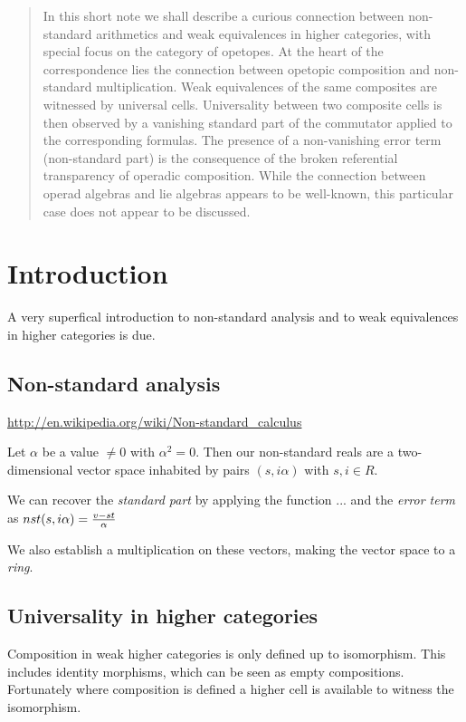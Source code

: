 \documentclass{article}
\begin{document}
\newcommand{\compose}[3]{$#1{;_#2}#3$}
\newcommand{\nsproduct}[3]{$(#1 + #2)(#3 + #2)$}
\newcommand{\lie}[4]{$#1{_{[#2,#3]}}#4$}

\begin{abstract}
In this short note we shall describe a curious connection
between non-standard arithmetics and weak equivalences
in higher categories, with special focus on the category of
opetopes. At the heart of the correspondence lies the
connection between opetopic composition and non-standard
multiplication. Weak equivalences of the same composites are
witnessed by universal cells. Universality between two
composite cells is then observed by a vanishing standard
part of the commutator applied to the corresponding formulas.
The presence of a non-vanishing error term (non-standard part)
is the consequence of the broken referential transparency of
operadic composition.
While the connection between operad algebras and
lie algebras appears to be well-known, this particular
case does not appear to be discussed.
\end{abstract}

\section{Introduction}
A very superfical introduction to non-standard analysis
and to weak equivalences in higher categories is due.

\subsection{Non-standard analysis}

\url{http://en.wikipedia.org/wiki/Non-standard_calculus}

Let $\alpha$ be a value $\neq 0$ with $\alpha^2 = 0$. Then
our non-standard reals are a two-dimensional vector space
inhabited by pairs $(s, i \alpha)$ with $s, i \in R$.

We can recover the \emph{standard part} by applying the function
... 
and the \emph{error term} as $nst (s, i\alpha) = {v - st \over \alpha}$

We also establish a multiplication on these vectors, making
the vector space to a \emph{ring}.

\subsection{Universality in higher categories}

Composition in weak higher categories is only defined up to
isomorphism. This includes identity morphisms, which can be
seen as empty compositions. Fortunately where composition
is defined a higher cell is available to witness the isomorphism.
\end{document}
